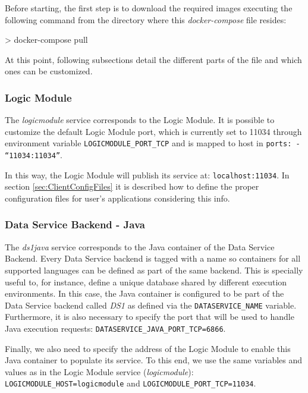 Before starting, the first step is to download the required images executing the following command from the directory where this \textit{docker-compose} file resides:
\begin{tBox}
 \begin{bash}
  > docker-compose pull
 \end{bash}
\end{tBox}

At this point, following subsections detail the different parts of the file and which ones can be customized.

\subsubsection{Logic Module}
The \textit{logicmodule}  service corresponds to the Logic Module. It is possible to customize the default Logic Module port, which is currently set to 11034 through environment variable \texttt{LOGICMODULE\_PORT\_TCP} and is mapped to host in \texttt{ports: - ``11034:11034''}. 

In this way, the Logic Module will publish its service at: \texttt{localhost:11034}. In section \ref{sec:ClientConfigFiles} it is described how to define the proper configuration files for user's applications considering this info.

\subsubsection{Data Service Backend - Java}
The \textit{ds1java}  service corresponds to the Java container of the Data Service Backend. Every Data Service backend is tagged with a name so containers for all supported languages can be defined as part of the same backend. This is specially useful to, for instance, define a unique database shared by different execution environments. In this case, the Java container is configured to be part of the Data Service backend called \textit{DS1} as defined via the \texttt{DATASERVICE\_NAME} variable. Furthermore, it is also necessary to specify the port that will be used to handle Java execution requests: \texttt{DATASERVICE\_JAVA\_PORT\_TCP=6866}.

Finally, we also need to specify the address of the Logic Module to enable this Java container to populate its service. To this end, we use the same variables and values as in the Logic Module service (\textit{logicmodule}): \texttt{LOGICMODULE\_HOST=logicmodule} and \texttt{LOGICMODULE\_PORT\_TCP=11034}.

